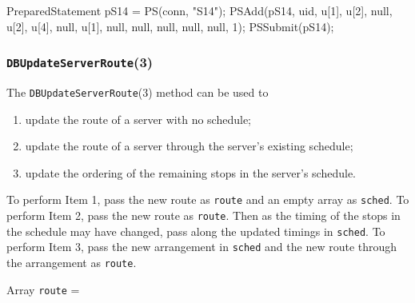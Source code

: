 \documentclass{article}
\def\nwendcode{\endtrivlist \endgroup}      %
\let\nwdocspar=\par
\theoremstyle{definition}                   %
\begin{document}
\nwenddocs{}\endmoddef{}
PreparedStatement pS14 = PS(conn, "S14");
PSAdd(pS14, uid, u[1], u[2], null, u[2], u[4], null, u[1],
    null, null, null, null, null, 1);
PSSubmit(pS14);
\nwendcode{}\nwdocspar

\subsubsection{{\tt{}\protect{}DBUpdateServerRoute}(3)}
The {\tt{}\protect{}DBUpdateServerRoute}(3) method can be used to
\begin{enumerate}
\item update the route of a server with no schedule;
\item update the route of a server through the server's existing schedule;
\item update the ordering of the remaining stops in the server's schedule.
\end{enumerate}
To perform Item 1, pass the new route as {\tt{}route} and an empty array as
{\tt{}sched}. To perform Item 2, pass the new route as {\tt{}route}. Then as the
timing of the stops in the schedule may have changed, pass along the updated
timings in {\tt{}sched}. To perform Item 3, pass the new arrangement in {\tt{}sched}
and the new route through the arrangement as {\tt{}route}.

Array {\tt{}route} =

\noindent
{}
\end{document}
